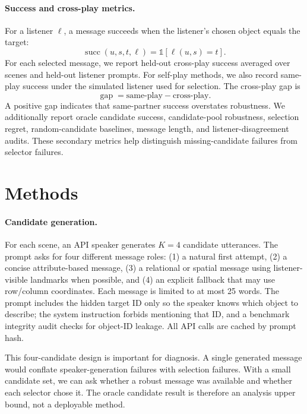 \paragraph{Success and cross-play metrics.}
For a listener $\ell$, a message succeeds when the listener's chosen object equals the target:
\[
  \operatorname{succ}(u,s,t,\ell) = \mathbb{1}[\ell(u,s)=t].
\]
For each selected message, we report held-out cross-play success averaged over scenes and held-out listener prompts. For self-play methods, we also record same-play success under the simulated listener used for selection. The cross-play gap is
\[
  \operatorname{gap} = \text{same-play} - \text{cross-play}.
\]
A positive gap indicates that same-partner success overstates robustness. We additionally report oracle candidate success, candidate-pool robustness, selection regret, random-candidate baselines, message length, and listener-disagreement audits. These secondary metrics help distinguish missing-candidate failures from selector failures.

\section{Methods}

\paragraph{Candidate generation.}
For each scene, an API speaker generates $K=4$ candidate utterances. The prompt asks for four different message roles: (1) a natural first attempt, (2) a concise attribute-based message, (3) a relational or spatial message using listener-visible landmarks when possible, and (4) an explicit fallback that may use row/column coordinates. Each message is limited to at most 25 words. The prompt includes the hidden target ID only so the speaker knows which object to describe; the system instruction forbids mentioning that ID, and a benchmark integrity audit checks for object-ID leakage. All API calls are cached by prompt hash.

This four-candidate design is important for diagnosis. A single generated message would conflate speaker-generation failures with selection failures. With a small candidate set, we can ask whether a robust message was available and whether each selector chose it. The oracle candidate result is therefore an analysis upper bound, not a deployable method.

